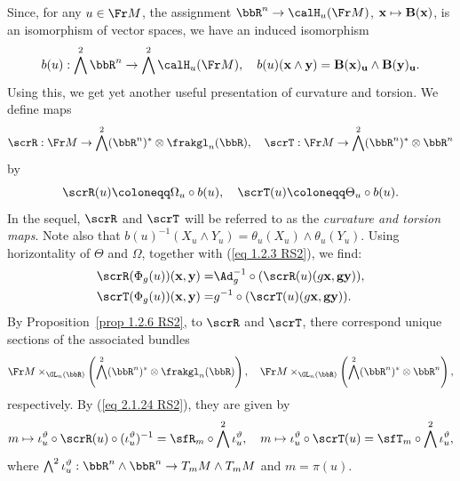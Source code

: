 \begin{rem}\label{rem 2.1.16 RS2}
    Since, for any $u\in\Fr M$, the assignment $\bbR^n\to \calH_u (\Fr M)$, $\bf{x}\mapsto B(\bf{x})$, is an isomorphism of vector spaces, we have an induced isomorphism 
    \[b(u):\bigwedge^2\bbR^n\to \bigwedge^2 \calH_u(\Fr M),\quad b(u)(\bf{x}\wedge\bf{y})=B(\bf{x})_u\wedge B(\bf{y})_u.\]
    Using this, we get yet another useful presentation of curvature and torsion. We define maps 
    \[\scrR:\Fr M\to \bigwedge^2(\bbR^n)^\ast \otimes\frakgl_n(\bbR),\quad \scrT:\Fr M\to \bigwedge^2(\bbR^n)^\ast\otimes\bbR^n\]
    by 
    \[\scrR(u)\coloneqq \Omega_u\circ b(u),\quad \scrT(u)\coloneqq \Theta_u\circ b(u).\label{eq 2.1.24 RS2}\]
    In the sequel, $\scrR$ and $\scrT$ will be referred to as the \emph{curvature and torsion maps}. Note also that $b(u)^{-1}(X_u\wedge Y_u)=\theta_u(X_u)\wedge\theta_u(Y_u)$. Using horizontality of $\Theta$ and $\Omega$, together with (\ref{eq 1.2.3 RS2}), we find:
    \begin{align}
        \scrR(\Phi_g(u))(\bf{x},\bf{y})=&\Ad_g^{-1}\circ (\scrR(u)(g\bf{x},g\bf{y})),\\
        \scrT(\Phi_g(u))(\bf{x},\bf{y})=& g^{-1}\circ (\scrT(u)(g\bf{x},g\bf{y})).
    \end{align}
    By Proposition~\ref{prop 1.2.6 RS2}, to $\scrR$ and $\scrT$, there correspond unique sections of the associated bundles 
    \[\Fr M\times_{\GL_n(\bbR)}\left(\bigwedge^2(\bbR^n)^\ast \otimes \frakgl_n(\bbR)\right),\quad \Fr M\times_{\GL_n(\bbR)}\left(\bigwedge^2(\bbR^n)^\ast \otimes\bbR^n\right),\]
    respectively. By (\ref{eq 2.1.24 RS2}), they are given by 
    \[m\mapsto \iota_u^\vartheta\circ \scrR(u)\circ (\iota_u^\vartheta)^{-1}=\sfR_m\circ\bigwedge^2 \iota_u^\vartheta,\quad m\mapsto \iota_u^\vartheta\circ\scrT(u)=\sfT_m\circ \bigwedge^2 \iota_u^\vartheta,\]
    where $\bigwedge^2 \iota_u^\vartheta:\bbR^n\wedge\bbR^n\to T_mM\wedge T_mM$ and $m=\pi(u)$.
\end{rem}


